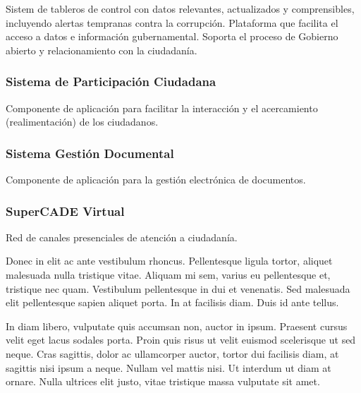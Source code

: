 \documentclass[
	a4paper, %
	12pt, %
]{include/CSSullivanBusinessReport}
\begin{document}
Sistem de tableros de control con datos relevantes, actualizados y
comprensibles, incluyendo alertas tempranas contra la corrupción.
Plataforma que facilita el acceso a datos e información gubernamental.
Soporta el proceso de Gobierno abierto y relacionamiento con la
ciudadanía.

\subsubsection{Sistema de Participación
Ciudadana}\label{sec:sistema-de-participaciuxf3n-ciudadana}

Componente de aplicación para facilitar la interacción y el acercamiento
(realimentación) de los ciudadanos.

\subsubsection{Sistema Gestión
Documental}\label{sec:sistema-gestiuxf3n-documental}

Componente de aplicación para la gestión electrónica de documentos.

\subsubsection{SuperCADE Virtual}\label{sec:supercade-virtual}

Red de canales presenciales de atención a
ciudadanía.

Donec in elit ac ante vestibulum rhoncus. Pellentesque ligula tortor, aliquet malesuada nulla tristique vitae. Aliquam mi sem, varius eu pellentesque et, tristique nec quam. Vestibulum pellentesque in dui et venenatis. Sed malesuada elit pellentesque sapien aliquet porta. In at facilisis diam. Duis id ante tellus. %

In diam libero, vulputate quis accumsan non, auctor in ipsum. Praesent cursus velit eget lacus sodales porta. Proin quis risus ut velit euismod scelerisque ut sed neque. Cras sagittis, dolor ac ullamcorper auctor, tortor dui facilisis diam, at sagittis nisi ipsum a neque. Nullam vel mattis nisi. Ut interdum ut diam at ornare. Nulla ultrices elit justo, vitae tristique massa vulputate sit amet.
\end{document}

